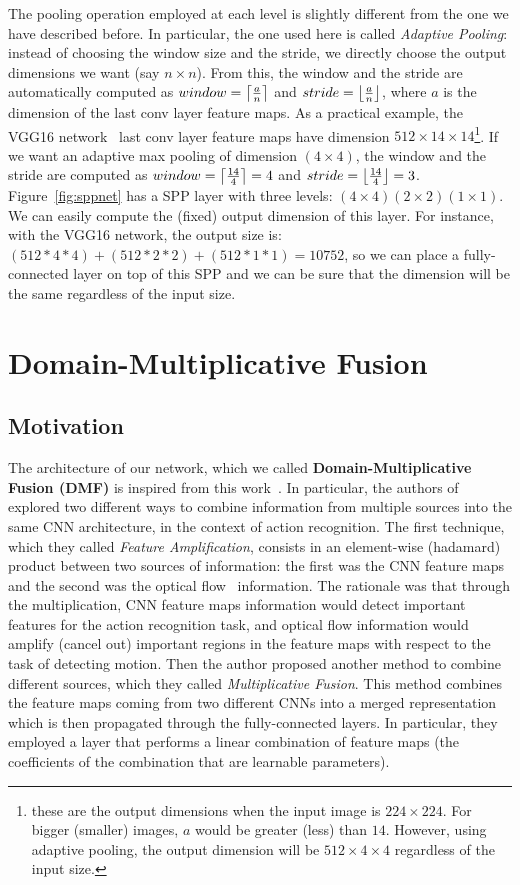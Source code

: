 \documentclass[../main.tex]{subfiles}
\begin{document}
    The pooling operation employed at each level is slightly different from the
    one we have described before. In particular, the one used here is called \textit{Adaptive Pooling}: instead of choosing the window size and the
    stride, we directly choose the output dimensions we want (say $n \times n$). From this, the window and the stride are automatically computed
    as $window = \ceil*{\frac{a}{n}}$ and $stride = \floor*{\frac{a}{n}}$, where $a$ is the dimension of the last conv layer feature maps. As a
    practical example, the VGG16 network~\cite{vgg16} last conv layer feature maps have dimension $512 \times 14 \times 14$\footnote{these are
    the output dimensions when the input image is $224 \times 224$. For bigger (smaller) images, $a$ would be greater (less) than $14$.
    However, using adaptive pooling, the output dimension will be $512 \times 4 \times 4$ regardless of the input size.}.
    If we want an adaptive max pooling of dimension $(4 \times 4)$, the window and the stride are computed as
    $window = \ceil*{\frac{14}{4}} = 4$ and $stride = \floor*{\frac{14}{4}} = 3$. Figure~\ref{fig:sppnet} has a SPP layer with three levels:
    $(4 \times 4) (2 \times 2) (1 \times 1)$. We can easily compute the (fixed) output dimension of this layer. For instance, with the VGG16
    network, the output size is: $(512*4*4) + (512*2*2) + (512*1*1) = 10752$, so we can place a fully-connected layer on top of this SPP and
    we can be sure that the dimension will be the same regardless of the input size.

    \section{Domain-Multiplicative Fusion}
    \subsection{Motivation}
    The architecture of our network, which we called \textbf{Domain-Multiplicative Fusion (DMF)} is inspired from this work~\cite{multfusion}.
    In particular, the authors of~\cite{multfusion} explored two different ways to combine information from multiple sources into the same
    CNN architecture, in the context of action recognition. The first technique, which they called \textit{Feature Amplification},
    consists in an element-wise (hadamard) product between two sources of information: the first was the CNN feature maps and the second
    was the optical flow~\cite{opticalflow} information. The rationale was that through the multiplication, CNN feature maps information
    would detect important features for the action recognition task, and optical flow information would amplify (cancel out) important regions
    in the feature maps with respect to the task of detecting motion.
    Then the author proposed another method to combine different sources, which they called \textit{Multiplicative Fusion}. This method combines
    the feature maps coming from two different CNNs into a merged representation which is then propagated through the fully-connected layers.
    In particular, they employed a layer that performs a linear combination of feature maps (the coefficients of the combination that are learnable
    parameters).
\end{document}
